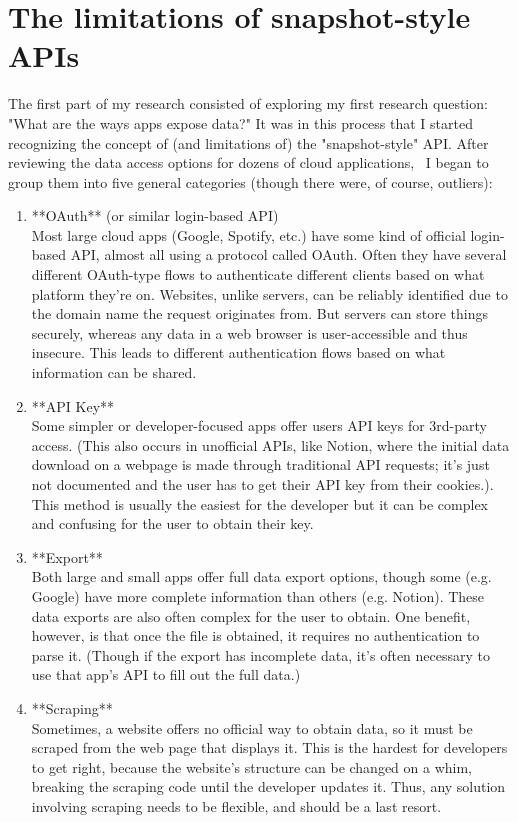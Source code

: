 \documentclass[manuscript,review,anonymous]{acmart}
\begin{document}
\section{The limitations of snapshot-style APIs}
The first part of my research consisted of exploring my first research question: "What are the ways apps expose data?" It was in this process that I started recognizing the concept of (and limitations of) the "snapshot-style" API. After reviewing the data access options for dozens of cloud applications,~\cite{kramerMakingDataPortability} I began to group them into five general categories (though there were, of course, outliers):
\begin{enumerate}
  \item **OAuth** (or similar login-based API) \\
  Most large cloud apps (Google, Spotify, etc.) have some kind of official login-based API, almost all using a protocol called OAuth. Often they have several different OAuth-type flows to authenticate different clients based on what platform they’re on. Websites, unlike servers, can be reliably identified due to the domain name the request originates from. But servers can store things securely, whereas any data in a web browser is user-accessible and thus insecure. This leads to different authentication flows based on what information can be shared.
  \item **API Key** \\
  Some simpler or developer-focused apps offer users API keys for 3rd-party access. (This also occurs in unofficial APIs, like Notion, where the initial data download on a webpage is made through traditional API requests; it's just not documented and the user has to get their API key from their cookies.). This method is usually the easiest for the developer but it can be complex and confusing for the user to obtain their key.
  \item **Export** \\
  Both large and small apps offer full data export options, though some (e.g. Google) have more complete information than others (e.g. Notion). These data exports are also often complex for the user to obtain. One benefit, however, is that once the file is obtained, it requires no authentication to parse it. (Though if the export has incomplete data, it's often necessary to use that app's API to fill out the full data.)
  \item **Scraping** \\
  Sometimes, a website offers no official way to obtain data, so it must be scraped from the web page that displays it. This is the hardest for developers to get right, because the website's structure can be changed on a whim, breaking the scraping code until the developer updates it. Thus, any solution involving scraping needs to be flexible, and should be a last resort.

\end{enumerate}
\end{document}
